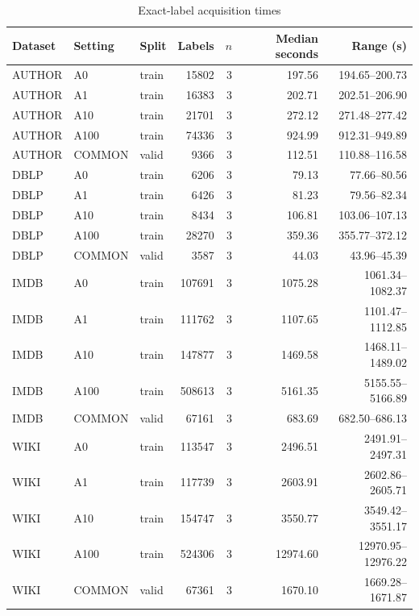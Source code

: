 \begin{table}[H]
\centering
\small
\setlength{\tabcolsep}{5pt}
\caption{Exact-label acquisition times}
\label{tab:E_labels}
\begin{tabular}{@{}lllrrrr@{}}
\toprule
Dataset & Setting & Split & Labels & $n$ & Median seconds & Range (s) \\
\midrule
AUTHOR & A0 & train & 15802 & 3 & 197.56 & 194.65--200.73 \\
AUTHOR & A1 & train & 16383 & 3 & 202.71 & 202.51--206.90 \\
AUTHOR & A10 & train & 21701 & 3 & 272.12 & 271.48--277.42 \\
AUTHOR & A100 & train & 74336 & 3 & 924.99 & 912.31--949.89 \\
AUTHOR & COMMON & valid & 9366 & 3 & 112.51 & 110.88--116.58 \\
DBLP & A0 & train & 6206 & 3 & 79.13 & 77.66--80.56 \\
DBLP & A1 & train & 6426 & 3 & 81.23 & 79.56--82.34 \\
DBLP & A10 & train & 8434 & 3 & 106.81 & 103.06--107.13 \\
DBLP & A100 & train & 28270 & 3 & 359.36 & 355.77--372.12 \\
DBLP & COMMON & valid & 3587 & 3 & 44.03 & 43.96--45.39 \\
IMDB & A0 & train & 107691 & 3 & 1075.28 & 1061.34--1082.37 \\
IMDB & A1 & train & 111762 & 3 & 1107.65 & 1101.47--1112.85 \\
IMDB & A10 & train & 147877 & 3 & 1469.58 & 1468.11--1489.02 \\
IMDB & A100 & train & 508613 & 3 & 5161.35 & 5155.55--5166.89 \\
IMDB & COMMON & valid & 67161 & 3 & 683.69 & 682.50--686.13 \\
WIKI & A0 & train & 113547 & 3 & 2496.51 & 2491.91--2497.31 \\
WIKI & A1 & train & 117739 & 3 & 2603.91 & 2602.86--2605.71 \\
WIKI & A10 & train & 154747 & 3 & 3550.77 & 3549.42--3551.17 \\
WIKI & A100 & train & 524306 & 3 & 12974.60 & 12970.95--12976.22 \\
WIKI & COMMON & valid & 67361 & 3 & 1670.10 & 1669.28--1671.87 \\
\bottomrule
\end{tabular}
\end{table}
